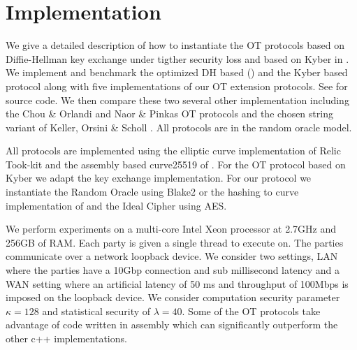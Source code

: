 \section{Implementation}\label{sec:impl}

We give a detailed description of how to instantiate the OT protocols based on Diffie-Hellman key exchange under tigther security loss and based on Kyber in . We implement and benchmark the optimized DH based () and the Kyber based protocol along with five implementations of our OT extension protocols. See \cite{libOTe} for source code. We then compare these two several other implementation including the Chou \& Orlandi \cite{LC:ChoOrl15} and Naor \& Pinkas \cite{SODA:NaoPin01} OT protocols and the chosen string variant of Keller, Orsini \& Scholl \cite{C:KelOrsSch15}.  All protocols are in the random oracle model.

All protocols are implemented 
using the elliptic curve implementation of Relic Took-kit\cite{relic} and the assembly based curve25519 of \cite{LC:ChoOrl15,simplest}. For the OT protocol based on Kyber we adapt the \cite{NISTPQC-R1:CRYSTALS-KYBER17} key exchange implementation. For our protocol we instantiate the Random Oracle using Blake2 or the hashing to curve implementation of \cite{relic} and the Ideal Cipher using AES.

We perform experiments on a multi-core Intel Xeon processor at 2.7GHz and 256GB of RAM. Each party is given a single thread to execute on. The parties communicate over a network loopback device. We consider two settings, LAN where the parties have a 10Gbp connection and sub millisecond latency and a WAN setting where an artificial latency of 50 ms and throughput of 100Mbps is imposed on the loopback device. We consider computation security parameter $\kappa=128$ and statistical security of $\lambda=40$.  Some of the OT protocols take advantage of code written in assembly which can significantly outperform the other c++ implementations.
\newcommand{\mr}[2]{\multirow{#1}{*}{#2}}

